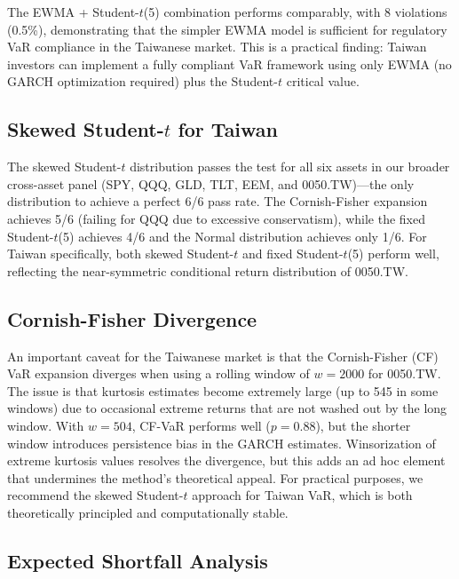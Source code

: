 The EWMA + Student-$t$(5) combination performs comparably, with 8 violations (0.5\%), demonstrating that the simpler EWMA model is sufficient for regulatory VaR compliance in the Taiwanese market. This is a practical finding: Taiwan investors can implement a fully compliant VaR framework using only EWMA (no GARCH optimization required) plus the Student-$t$ critical value.

\subsection{Skewed Student-$t$ for Taiwan}

The skewed Student-$t$ distribution passes the \citet{kupiec1995} test for all six assets in our broader cross-asset panel (SPY, QQQ, GLD, TLT, EEM, and 0050.TW)---the only distribution to achieve a perfect 6/6 pass rate. The Cornish-Fisher expansion achieves 5/6 (failing for QQQ due to excessive conservatism), while the fixed Student-$t$(5) achieves 4/6 and the Normal distribution achieves only 1/6. For Taiwan specifically, both skewed Student-$t$ and fixed Student-$t$(5) perform well, reflecting the near-symmetric conditional return distribution of 0050.TW.

\subsection{Cornish-Fisher Divergence}

An important caveat for the Taiwanese market is that the Cornish-Fisher (CF) VaR expansion diverges when using a rolling window of $w = 2000$ for 0050.TW. The issue is that kurtosis estimates become extremely large (up to 545 in some windows) due to occasional extreme returns that are not washed out by the long window. With $w = 504$, CF-VaR performs well ($p = 0.88$), but the shorter window introduces persistence bias in the GARCH estimates. Winsorization of extreme kurtosis values resolves the divergence, but this adds an ad hoc element that undermines the method's theoretical appeal. For practical purposes, we recommend the skewed Student-$t$ approach for Taiwan VaR, which is both theoretically principled and computationally stable.

\subsection{Expected Shortfall Analysis}\label{sec:es_analysis}


